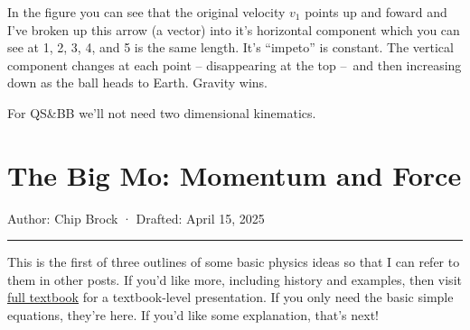 \documentclass[
  letterpaper,
  DIV=11,
  numbers=noendperiod,
  oneside]{scrreprt}
\begin{document}
In the figure you can see that the original velocity \(v_1\) points up
and foward and I've broken up this arrow (a vector) into it's horizontal
component which you can see at 1, 2, 3, 4, and 5 is the same length.
It's ``impeto'' is constant. The vertical component changes at each
point -- disappearing at the top --~and then increasing down as the ball
heads to Earth. Gravity wins.

For QS\&BB we'll not need two dimensional kinematics.

\chapter{The Big Mo: Momentum and
Force}\label{the-big-mo-momentum-and-force}

Author: Chip Brock · Drafted: April 15, 2025

\begin{center}\rule{0.5\linewidth}{0.5pt}\end{center}


This is the first of three outlines of some basic physics ideas so that
I can refer to them in other posts. If you'd like more, including
history and examples, then visit
\href{https://qstbb.pa.msu.edu/storage/ISP220_fall2020/QS&BB2020/intro.html}{full
textbook} for a textbook-level presentation. If you only need the basic
simple equations, they're here. If you'd like some explanation, that's
next!
\end{document}
